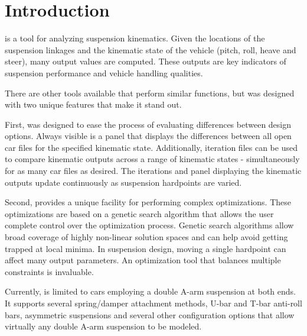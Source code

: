 \chapter{Introduction} \label{ch:introduction}


\vvase{} is a tool for analyzing suspension kinematics.  Given the locations of the suspension linkages and the kinematic state of the vehicle (pitch, roll, heave and steer), many output values are computed.  These outputs are key indicators of suspension performance and vehicle handling qualities.

There are other tools available that perform similar functions, but \vvase{} was designed with two unique features that make it stand out.

First, \vvase{} was designed to ease the process of evaluating differences between design options.  Always visible is a panel that displays the differences between all open car files for the specified kinematic state.  Additionally, iteration files can be used to compare kinematic outputs across a range of kinematic states - simultaneously for as many car files as desired.  The iterations and panel displaying the kinematic outputs update continuously as suspension hardpoints are varied.

Second, \vvase{} provides a unique facility for performing complex optimizations.  These optimizations are based on a genetic search algorithm that allows the user complete control over the optimization process.  Genetic search algorithms allow broad coverage of highly non-linear solution spaces and can help avoid getting trapped at local minima.  In suspension design, moving a single hardpoint can affect many output parameters.  An optimization tool that balances multiple constraints is invaluable.

Currently, \vvase{} is limited to cars employing a double A-arm suspension at both ends.  It supports several spring/damper attachment methods, U-bar and T-bar anti-roll bars, asymmetric suspensions and several other configuration options that allow virtually any double A-arm suspension to be modeled.
